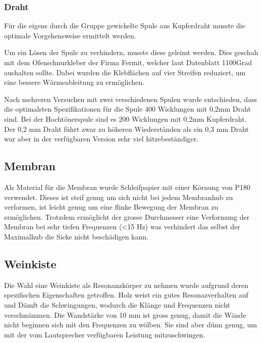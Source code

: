 \documentclass[a4paper,11pt]{report}
\begin{document}
\subsubsection*{Draht}

Für die eigens durch die Gruppe gewickelte Spule aus Kupferdraht musste die optimale Vorgehensweise ermittelt werden.

Um ein Lösen der Spule zu verhindern, musste diese geleimt werden. Dies geschah mit dem Ofenschnurkleber der Firma Fermit, welcher laut Datenblatt 1100Grad aushalten sollte. Dabei wurden die Klebflächen auf vier Streifen reduziert, um eine bessere Wärmeableitung zu ermöglichen.

Nach mehreren Versuchen mit zwei verschiedenen Spulen wurde entschieden, dass die optimalsten Spezifikationen für die Spule 400 Wicklungen mit 0,2mm Draht sind. Bei der Hochtönerspule sind es 200 Wicklungen mit 0,2mm Kupferdraht. Der 0,2 mm Draht führt zwar zu höheren Wiederständen als ein 0,3 mm Draht war aber in der verfügbaren Version sehr viel hitzebeständiger. 

\subsection{Membran}
Als Material für die Membran wurde Schleifpapier mit einer Körnung von P180 verwendet. Dieses ist steif genug um sich nicht bei jedem Membranhub zu verformen, ist leicht genug um eine flinke Bewegung der Membran zu ermöglichen. Trotzdem ermöglicht der grosse Durchmesser eine Verformung der Membran bei sehr tiefen Frequenzen (<15 Hz) was verhindert das selbst der Maximalhub die Sicke nicht beschädigen kann. 

\subsection{Weinkiste}
Die Wahl eine Weinkiste als Resonanzkörper zu nehmen wurde aufgrund deren spezifischen Eigenschaften getroffen. Holz weist ein gutes Resonazverhalten auf und Dämft die Schwingungen, wodurch die Klänge und Frequenzen nicht verschmimmen. Die Wandstärke von 10 mm ist gross genug, damit die Wände nicht beginnen sich mit den Frequenzen zu wölben. Sie sind aber dünn genug, um mit der vom Lautsprecher verfügbaren Leistung mitzuschwingen. 
\end{document}
